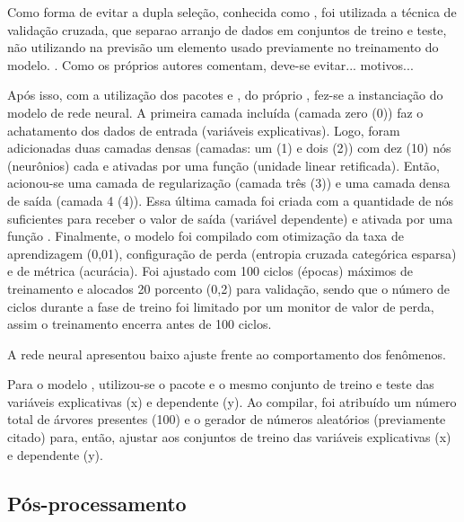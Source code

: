 \documentclass[
	12pt,				%
	openright,			%
	oneside,			%
	a4paper,			%
	english,			%
	french,				%
	spanish,			%
	brazil				%
	dvipsnames, table]{abntex2}
\begin{document}
\indent Como forma de evitar a dupla seleção, conhecida como , foi utilizada a técnica de validação cruzada, que separao arranjo de dados em conjuntos de treino e teste, não utilizando na previsão um elemento usado previamente no treinamento do modelo. \cite{doubleDipping_2020_ball}. Como os próprios autores comentam, deve-se evitar... motivos...

\indent Após isso, com a utilização dos pacotes  \cite{tensorflow_2015_whitepaper} e  \cite{keras_2015_chollet}, do próprio , fez-se a instanciação do modelo de rede neural. A primeira camada incluída (camada zero (0)) faz o achatamento dos dados de entrada (variáveis explicativas). Logo, foram adicionadas duas camadas densas (camadas: um (1) e dois (2)) com dez (10) nós (neurônios) cada e ativadas por uma função  (unidade linear retificada). Então, acionou-se uma camada de regularização (camada três (3)) e uma camada densa de saída (camada 4 (4)). Essa última camada foi criada com a quantidade de nós suficientes para receber o valor de saída (variável dependente) e ativada por uma função . Finalmente, o modelo foi compilado com otimização da taxa de aprendizagem (0,01), configuração de perda (entropia cruzada categórica esparsa) e de métrica (acurácia). Foi ajustado com 100 ciclos (épocas) máximos de treinamento e alocados 20 porcento (0,2) para validação, sendo que o número de ciclos durante a fase de treino foi limitado por um monitor de valor de perda, assim o treinamento encerra antes de 100 ciclos.

\indent A rede neural apresentou baixo ajuste frente ao comportamento dos fenômenos.


\indent Para o modelo , utilizou-se o pacote  e o mesmo conjunto de treino e teste das variáveis explicativas (x) e dependente (y). Ao compilar, foi atribuído um número total de árvores presentes (100) e o gerador de números aleatórios (previamente citado) para, então, ajustar aos conjuntos de treino das variáveis explicativas (x) e dependente (y).

\subsection{Pós-processamento}
\end{document}
